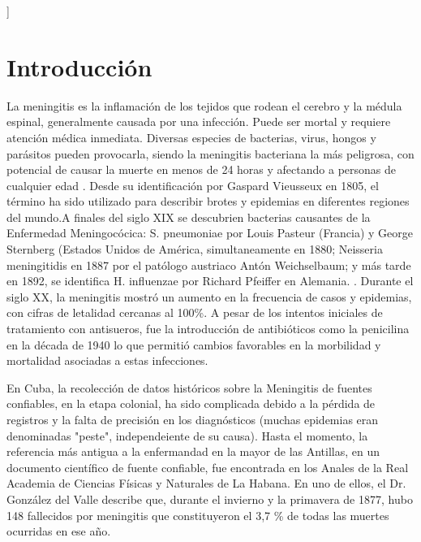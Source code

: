 \documentclass[a4paper,10pt,twocolumn]{article}
\begin{document}
\vspace{0.8cm}
]



\section{Introducción}\label{sec:intro}
		La meningitis es la inflamación de los tejidos que rodean el cerebro y la médula espinal, generalmente causada por una infección. Puede ser mortal y requiere atención médica inmediata. Diversas especies de bacterias, virus, hongos y parásitos pueden provocarla, siendo la meningitis bacteriana la más peligrosa, con potencial de causar la muerte en menos de 24 horas y afectando a personas de cualquier edad \cite{OMS_meinigitis}. Desde su identificación por Gaspard Vieusseux en 1805, el término ha sido utilizado para describir brotes y epidemias en diferentes regiones del mundo.A finales del siglo XIX se descubrien bacterias causantes de la Enfermedad Meningocócica: S. pneumoniae por Louis Pasteur (Francia) y George Sternberg (Estados Unidos de América, simultaneamente en 1880; Neisseria meningitidis en 1887 por el patólogo austriaco Antón Weichselbaum; y más tarde en 1892, se identifica H. influenzae por Richard Pfeiffer en Alemania.  \cite{batlle}. Durante el siglo XX, la meningitis mostró un aumento en la frecuencia de casos y epidemias, con cifras de letalidad cercanas al 100\%. A pesar de los intentos iniciales de tratamiento con antisueros, fue la introducción de antibióticos como la penicilina en la década de 1940 lo que permitió cambios favorables en la morbilidad y mortalidad asociadas a estas infecciones.
		
		En Cuba, la recolección de datos históricos sobre la Meningitis de fuentes confiables, en la etapa colonial, ha sido complicada debido a la pérdida de registros y la falta de precisión en los diagnósticos (muchas epidemias eran denominadas "peste", independeiente de su causa). Hasta el momento, la referencia más antigua a la enfermandad en la mayor de las Antillas, en un documento científico de fuente confiable, fue encontrada en los Anales de la Real Academia de Ciencias Físicas y Naturales de La Habana. En uno de ellos, el Dr. González del Valle describe que, durante el invierno y la primavera de 1877, hubo 148 fallecidos por meningitis que constituyeron el 3,7 \% de todas las muertes ocurridas en ese año.  \cite{batlle}
		
\end{document}
